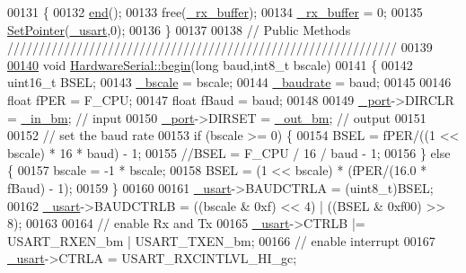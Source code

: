 \begin{DoxyCode}
00131 \{
00132     \hyperlink{class_hardware_serial_a0f86c41f580e04bdf30ea00e9014eacd}{end}();
00133     free(\hyperlink{class_hardware_serial_a9ee5f8b61e049f98dfd0b5ae53e97273}{_rx_buffer});
00134     \hyperlink{class_hardware_serial_a9ee5f8b61e049f98dfd0b5ae53e97273}{_rx_buffer} = 0;
00135     \hyperlink{_hardware_serial_8cpp_aaec4e4f887a958cc22dd447565d7080b}{SetPointer}(\hyperlink{class_hardware_serial_a3a3bd56aa561ae7e1eb1fd252b5b69a0}{_usart},0);
00136 \}
00137 
00138 \textcolor{comment}{// Public Methods //////////////////////////////////////////////////////////////}
00139 
\hypertarget{_hardware_serial_8cpp_source_l00140}{}\hyperlink{class_hardware_serial_a11049d350f4cf4bfdaafb24bb2738556}{00140} \textcolor{keywordtype}{void} \hyperlink{class_hardware_serial_a11049d350f4cf4bfdaafb24bb2738556}{HardwareSerial::begin}(\textcolor{keywordtype}{long} baud,int8\_t bscale)
00141 \{
00142     uint16\_t BSEL;
00143     \hyperlink{class_hardware_serial_a37dd406c01fd6432618925f0aeb329f3}{_bscale} = bscale;
00144     \hyperlink{class_hardware_serial_ae692ab4a0a8aad73c74a10066fa9da24}{_baudrate} = baud;
00145     
00146     \textcolor{keywordtype}{float} fPER = F\_CPU;
00147     \textcolor{keywordtype}{float} fBaud = baud;
00148     
00149     \hyperlink{class_hardware_serial_add54c7d986c6122e8e8c23303f5b4845}{_port}->DIRCLR = \hyperlink{class_hardware_serial_a8724fdfd3955eeff5d3ed535624ce79a}{_in_bm};  \textcolor{comment}{// input}
00150     \hyperlink{class_hardware_serial_add54c7d986c6122e8e8c23303f5b4845}{_port}->DIRSET = \hyperlink{class_hardware_serial_a751a284e15af72b026143a8091be1b70}{_out_bm}; \textcolor{comment}{// output}
00151     
00152     \textcolor{comment}{// set the baud rate}
00153     \textcolor{keywordflow}{if} (bscale >= 0) \{
00154         BSEL = fPER/((1 << bscale) * 16 * baud) - 1;
00155         \textcolor{comment}{//BSEL = F\_CPU / 16 / baud - 1;}
00156     \} \textcolor{keywordflow}{else} \{
00157         bscale = -1 * bscale;
00158         BSEL = (1 << bscale) * (fPER/(16.0 * fBaud) - 1);
00159     \}
00160     
00161     \hyperlink{class_hardware_serial_a3a3bd56aa561ae7e1eb1fd252b5b69a0}{_usart}->BAUDCTRLA = (uint8\_t)BSEL;
00162     \hyperlink{class_hardware_serial_a3a3bd56aa561ae7e1eb1fd252b5b69a0}{_usart}->BAUDCTRLB = ((bscale & 0xf) << 4) | ((BSEL & 0xf00) >> 8);
00163     
00164     \textcolor{comment}{// enable Rx and Tx}
00165     \hyperlink{class_hardware_serial_a3a3bd56aa561ae7e1eb1fd252b5b69a0}{_usart}->CTRLB |= USART\_RXEN\_bm | USART\_TXEN\_bm;
00166     \textcolor{comment}{// enable interrupt}
00167     \hyperlink{class_hardware_serial_a3a3bd56aa561ae7e1eb1fd252b5b69a0}{_usart}->CTRLA = USART\_RXCINTLVL\_HI\_gc;

\end{DoxyCode}
